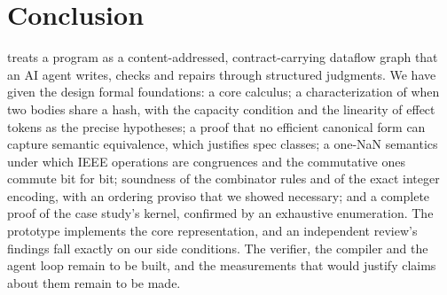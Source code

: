 \section{Conclusion}\label{sec:conclusion}

\VG{} treats a program as a content-addressed, contract-carrying dataflow graph that an AI agent
writes, checks and repairs through structured judgments. We have given the design formal
foundations: a core calculus; a characterization of when two bodies share a hash, with the
capacity condition and the linearity of effect tokens as the precise hypotheses; a proof that no
efficient canonical form can capture semantic equivalence, which justifies spec classes; a
one-NaN semantics under which IEEE operations are congruences and the commutative ones commute
bit for bit; soundness of the combinator rules and of the exact integer encoding, with an
ordering proviso that we showed necessary; and a complete proof of the case study's kernel,
confirmed by an exhaustive enumeration. The prototype implements the core representation, and an
independent review's findings fall exactly on our side conditions. The verifier, the compiler
and the agent loop remain to be built, and the measurements that would justify claims about them
remain to be made.
